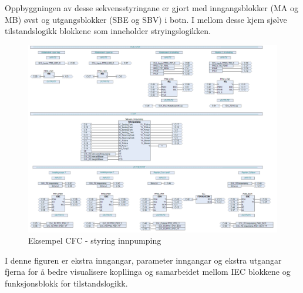 Oppbyggningen av desse sekvensstyringane er gjort med inngangsblokker (\gls{MA} og \gls{MB}) øvst og utgangsblokker (\gls{SBE} og \gls{SBV}) i botn.
I mellom desse kjem sjølve tilstandslogikk blokkene som inneholder stryingslogikken.

\begin{figure}[htbp]
    \centering
    \includegraphics[width=1\textwidth]{Bilder/Heile_innpump.png}
    \caption{Eksempel \gls{CFC} - styring innpumping}\label{fig:CFCInnpumping}
\end{figure}

I denne figuren er ekstra inngangar, parameter inngangar og ekstra utgangar fjerna for å bedre visualisere kopllinga og samarbeidet mellom
\gls{IEC} blokkene og funksjonsblokk for tilstandslogikk.

\newpage

